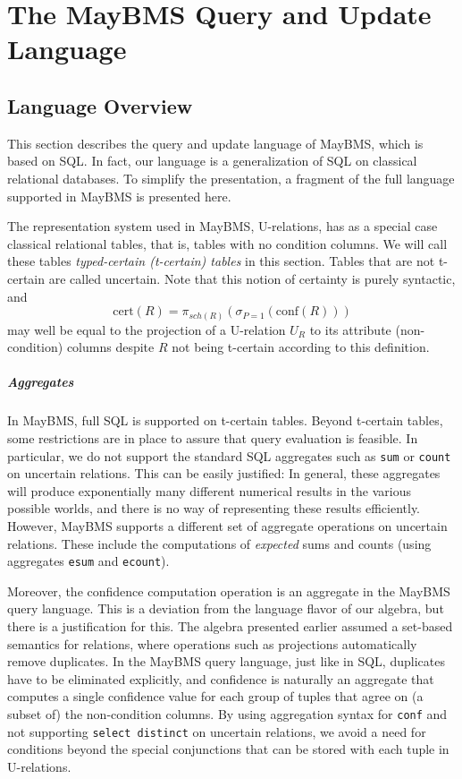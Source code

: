 
\chapter{The MayBMS Query and Update Language}


\section{Language Overview}
\label{sect:ql}


This section describes the query and update language of MayBMS, which is based on SQL.
In fact, our language is a generalization of SQL on classical relational databases.
To simplify the presentation, a fragment of the full language supported in MayBMS is presented here.

The representation system used in MayBMS, U-relations, has as a special case classical relational tables, that is, tables with no condition columns. We will call these tables {\em typed-certain (t-certain) tables}\/ in this section. Tables that are not t-certain are called uncertain.
Note that this notion of certainty is
purely syntactic, and
\[
\mbox{cert}(R) = \pi_{sch(R)}(\sigma_{P=1}(\mbox{conf}(R)))
\]
may well be equal to the projection of a U-relation $U_R$ to its attribute (non-condition) columns despite $R$ not being t-certain according to this definition.

\paragraph{Aggregates}
In MayBMS, full SQL is supported on t-certain tables.
Beyond t-certain tables, some restrictions are in place to assure that query evaluation is feasible. In particular, we do not support the standard SQL aggregates such as {\tt sum} or {\tt count} on uncertain relations. This can be easily justified: In general, these aggregates will produce exponentially many different numerical results in the various possible worlds, and there is no way of representing these results efficiently.  However, MayBMS supports a different set of aggregate operations on uncertain relations. These include the computations of {\em expected}\/ sums and counts (using aggregates {\tt esum} and {\tt ecount}).

Moreover, the confidence computation operation is an aggregate in the MayBMS query language.
This is a deviation from the language flavor of our algebra, but there is a justification for
this. The algebra presented earlier assumed a set-based semantics for relations, where operations
such as projections automatically remove duplicates. In the MayBMS query language, just like in SQL, duplicates have to be eliminated explicitly, and confidence is naturally an aggregate that computes a single confidence value for each group of tuples that agree on (a subset of) the non-condition columns.
By using aggregation syntax for {\tt conf} and not supporting {\tt select distinct} on uncertain relations, we avoid a need for conditions beyond the special conjunctions that can be stored with each tuple in
U-relations.

